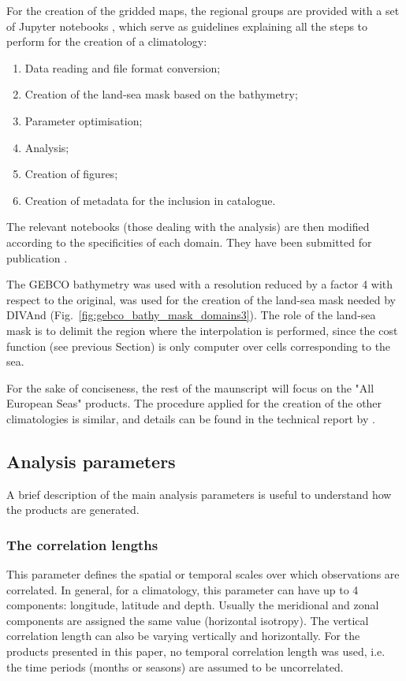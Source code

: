 \documentclass[essd, manuscript]{copernicus}
\begin{document}
For the creation of the gridded maps, the regional groups are provided with a set of Jupyter notebooks \citep[https://jupyter.org][]{KLUYVER2016}, which serve as guidelines explaining all the steps to perform for the creation of a climatology:
\begin{enumerate}
\item Data reading and file format conversion;
\item Creation of the land-sea mask based on the bathymetry;
\item Parameter optimisation;
\item Analysis;
\item Creation of figures;
\item Creation of metadata for the inclusion in catalogue.
\end{enumerate}
The relevant notebooks (those dealing with the analysis) are then modified according to the specificities of each domain. They have been submitted for publication \citep{TROUPIN2025}.

The GEBCO bathymetry \citep[2021 grid,][]{GEBCO2021} was used with a resolution reduced by a factor 4 with respect to the original, was used for the creation of the land-sea mask
needed by DIVAnd (Fig.~\ref{fig:gebco_bathy_mask_domains3}). The role of the land-sea mask is to delimit the region where the interpolation is performed, since the cost function (see previous Section) is only computer over cells corresponding to the sea. 

For the sake of conciseness, the rest of the maunscript will focus on the "All European Seas" products. The procedure applied for the creation of the other climatologies is similar, and details can be found in the technical report by \citep{BUGA2021}.

\subsection{Analysis parameters}

A brief description of the main analysis parameters is useful to understand how the products are generated.

\subsubsection{The correlation lengths}

This parameter defines the spatial or temporal scales  over which observations are correlated. In general, for a climatology, this parameter can have up to 4 components: longitude, latitude and depth. Usually the meridional and zonal components are assigned the same value (horizontal isotropy). The vertical correlation length can also be varying vertically and horizontally. For the products presented in this paper, no temporal correlation length was used, i.e. the time periods (months or seasons) are assumed to be uncorrelated. 
\end{document}
